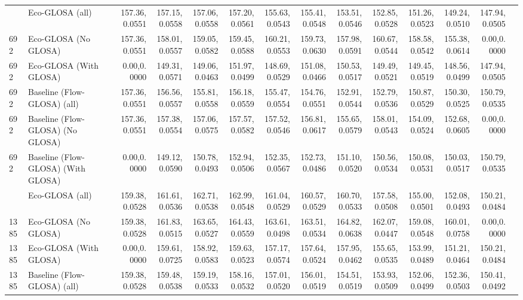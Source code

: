 \begin{table}[ht]
{\begin{tabular}{llrrrrrrrrrrrr}
      \addlinespace
      692  & Eco-GLOSA (all)                    & 157.36,0.0551 & 157.15,0.0558 & 157.06,0.0558 & 157.20,0.0561 & 155.63,0.0543 & 155.41,0.0548 & 153.51,0.0546 & 152.85,0.0528 & 151.26,0.0523 & 149.24,0.0510 & 147.94,0.0505 \\
      692  & Eco-GLOSA (No GLOSA)               & 157.36,0.0551 & 158.01,0.0557 & 159.05,0.0582 & 159.45,0.0588 & 160.21,0.0553 & 159.73,0.0630 & 157.98,0.0591 & 160.67,0.0544 & 158.58,0.0542 & 155.38,0.0614 &   0.00,0.0000 \\
      692  & Eco-GLOSA (With GLOSA)             &   0.00,0.0000 & 149.31,0.0571 & 149.06,0.0463 & 151.97,0.0499 & 148.69,0.0529 & 151.08,0.0466 & 150.53,0.0517 & 149.49,0.0521 & 149.45,0.0519 & 148.56,0.0499 & 147.94,0.0505 \\
      692  & Baseline (Flow-GLOSA) (all)        & 157.36,0.0551 & 156.56,0.0557 & 155.81,0.0558 & 156.18,0.0559 & 155.47,0.0554 & 154.76,0.0551 & 152.91,0.0544 & 152.79,0.0536 & 150.87,0.0529 & 150.30,0.0525 & 150.79,0.0535 \\
      692  & Baseline (Flow-GLOSA) (No GLOSA)   & 157.36,0.0551 & 157.38,0.0554 & 157.06,0.0575 & 157.57,0.0582 & 157.52,0.0546 & 156.81,0.0617 & 155.65,0.0579 & 158.01,0.0543 & 154.09,0.0524 & 152.68,0.0605 &   0.00,0.0000 \\
      692  & Baseline (Flow-GLOSA) (With GLOSA) &   0.00,0.0000 & 149.12,0.0590 & 150.78,0.0493 & 152.94,0.0506 & 152.35,0.0567 & 152.73,0.0486 & 151.10,0.0520 & 150.56,0.0534 & 150.08,0.0531 & 150.03,0.0517 & 150.79,0.0535 \\
      \addlinespace
      1385 & Eco-GLOSA (all)                   & 159.38,0.0528 & 161.61,0.0536 & 162.71,0.0538 & 162.99,0.0548 & 161.04,0.0529 & 160.57,0.0529 & 160.70,0.0533 & 157.58,0.0508 & 155.00,0.0501 & 152.08,0.0493 & 150.21,0.0484 \\
      1385 & Eco-GLOSA (No GLOSA)              & 159.38,0.0528 & 161.83,0.0515 & 163.65,0.0527 & 164.43,0.0559 & 163.61,0.0498 & 163.51,0.0534 & 164.82,0.0638 & 162.07,0.0447 & 159.08,0.0548 & 160.01,0.0758 &   0.00,0.0000 \\
      1385 & Eco-GLOSA (With GLOSA)            &   0.00,0.0000 & 159.61,0.0725 & 158.92,0.0583 & 159.63,0.0523 & 157.17,0.0574 & 157.64,0.0524 & 157.95,0.0462 & 155.65,0.0535 & 153.99,0.0489 & 151.21,0.0464 & 150.21,0.0484 \\
      1385 & Baseline (Flow-GLOSA) (all)       & 159.38,0.0528 & 159.48,0.0538 & 159.19,0.0533 & 158.16,0.0532 & 157.01,0.0520 & 156.01,0.0519 & 154.51,0.0519 & 153.93,0.0509 & 152.06,0.0499 & 152.36,0.0503 & 150.41,0.0492 \\

\end{tabular}}
\end{table}
